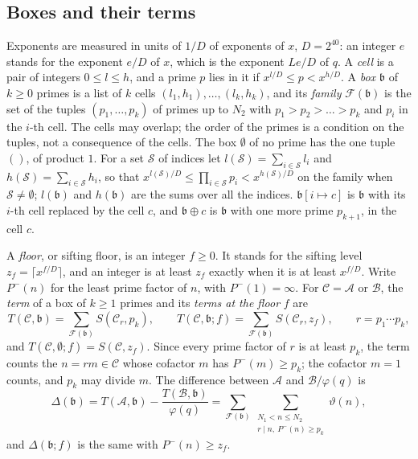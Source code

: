 \documentclass[11pt]{article}
\theoremstyle{definition}
\begin{document}
\subsection{Boxes and their terms}\label{sec:boxes}

Exponents are measured in units of $1/D$ of exponents of $x$, $D = 2^{40}$: an integer $e$ stands for the exponent
$e/D$ of $x$, which is the exponent $Le/D$ of $q$. A \emph{cell} is a pair of integers $0 \le l \le h$, and a prime $p$
lies in it if $x^{l/D} \le p < x^{h/D}$. A \emph{box} $\mathfrak b$ of $k \ge 0$ primes is a list of $k$ cells $(l_1,
h_1), \dots, (l_k, h_k)$, and its \emph{family} $\mathcal F(\mathfrak b)$ is the set of the tuples $(p_1, \dots, p_k)$
of
primes up to $N_2$ with $p_1 > p_2 > \dots > p_k$ and $p_i$ in the $i$-th cell. The cells may overlap; the order of the
primes is a condition on the tuples, not a consequence of the cells. The box $\emptyset$ of no prime has the one tuple
$()$, of product $1$. For a set $\mathcal S$ of indices let $l(\mathcal S) = \sum_{i \in \mathcal S} l_i$ and
$h(\mathcal S) = \sum_{i \in \mathcal S} h_i$, so that $x^{l(\mathcal S)/D} \le \prod_{i \in \mathcal S} p_i <
x^{h(\mathcal S)/D}$ on the family when $\mathcal S \ne \emptyset$; $l(\mathfrak b)$ and $h(\mathfrak b)$ are the sums
over all the indices. $\mathfrak b[i \mapsto c]$ is $\mathfrak b$ with its $i$-th cell replaced by the cell $c$, and
$\mathfrak b \oplus c$ is $\mathfrak b$ with one more prime $p_{k + 1}$, in the cell $c$.

A \emph{floor}, or sifting floor, is an integer $f \ge 0$. It stands for the sifting level $z_f = \lceil x^{f/D}
\rceil$, and an integer is at
least
$z_f$ exactly when it is at least $x^{f/D}$. Write $P^-(n)$ for the least prime factor of $n$, with $P^-(1) = \infty$.
For $\mathcal C = \mathcal A$ or $\mathcal B$, the \emph{term} of a box of $k \ge 1$ primes and its \emph{terms at the
floor} $f$ are
\[
  T(\mathcal C, \mathfrak b) = \sum_{\mathcal F(\mathfrak b)} S(\mathcal C_r, p_k), \qquad
  T(\mathcal C, \mathfrak b; f) = \sum_{\mathcal F(\mathfrak b)} S(\mathcal C_r, z_f), \qquad r = p_1 \cdots p_k,
\]
and $T(\mathcal C, \emptyset; f) = S(\mathcal C, z_f)$. Since every prime factor of $r$ is at least $p_k$, the term
counts the $n = rm \in \mathcal C$ whose cofactor $m$ has $P^-(m) \ge p_k$; the cofactor $m = 1$ counts, and $p_k$ may
divide $m$. The difference between $\mathcal A$ and $\mathcal B/\varphi(q)$ is
\[
  \Delta(\mathfrak b) = T(\mathcal A, \mathfrak b) - \frac{T(\mathcal B, \mathfrak b)}{\varphi(q)}
  = \sum_{\mathcal F(\mathfrak b)} \sum_{\substack{N_1 < n \le N_2 \\ r \mid n,\ P^-(n) \ge p_k}} \vartheta(n),
\]
and $\Delta(\mathfrak b; f)$ is the same with $P^-(n) \ge z_f$.
\end{document}

